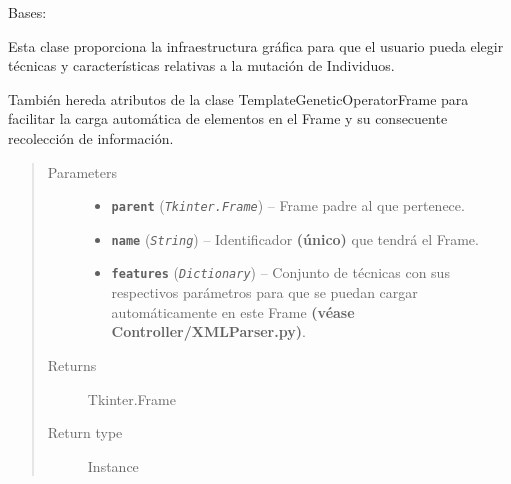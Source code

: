 \documentclass[letterpaper,10pt,english]{sphinxmanual}
\begin{document}
\begin{fulllineitems}
\label{View/Main/GeneticOperator/TemplateGeneticOperator/MutationFrame:View.Main.GeneticOperator.MutationFrame.MutationFrame}
Bases: {\hyperref[View/Main/GeneticOperator/TemplateGeneticOperator/TemplateGeneticOperatorFrame:View.Main.GeneticOperator.TemplateGeneticOperator.TemplateGeneticOperatorFrame.TemplateGeneticOperatorFrame]{}}

\begin{DUlineblock}{0em}
\item[] Esta clase proporciona la infraestructura gráfica para que el usuario pueda 
elegir técnicas y características relativas a la mutación de Individuos.
\item[] También hereda atributos de la clase TemplateGeneticOperatorFrame para facilitar
la carga automática de elementos en el Frame y su consecuente recolección de información.
\end{DUlineblock}
\begin{quote}\begin{description}
\item[{Parameters}] \leavevmode\begin{itemize}
\item {} 
\textbf{\texttt{parent}} (\emph{\texttt{Tkinter.Frame}}) -- Frame padre al que pertenece.

\item {} 
\textbf{\texttt{name}} (\emph{\texttt{String}}) -- Identificador \textbf{(único)} que tendrá el Frame.

\item {} 
\textbf{\texttt{features}} (\emph{\texttt{Dictionary}}) -- Conjunto de técnicas con sus respectivos parámetros para que
se puedan cargar automáticamente en este Frame \textbf{(véase
Controller/XMLParser.py)}.

\end{itemize}

\item[{Returns}] \leavevmode
Tkinter.Frame

\item[{Return type}] \leavevmode
Instance

\end{description}\end{quote}


\end{fulllineitems}
\end{document}
